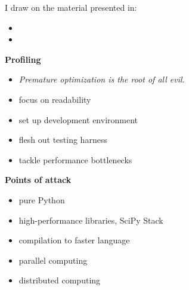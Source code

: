 \begin{frame} I draw on the material presented in:\vspace{0.3cm}

\begin{itemize}\setlength\itemsep{1em}
  \item {}
  \item {}
\end{itemize}

\end{frame}%
\begin{frame}\textbf{Profiling}\vspace{0.3cm}

\begin{itemize}\setlength\itemsep{1em}
    \item \textit{Premature optimization is the root of all evil.}
    \item focus on readability
    \item set up development environment
    \item flesh out testing harness
    \item tackle performance bottlenecks
\end{itemize}

\end{frame}
\begin{frame}\textbf{Points of attack}\vspace{0.3cm}

\begin{itemize}\setlength\itemsep{1em}
    \item pure Python
    \item high-performance libraries, SciPy Stack
    \item compilation to faster language
    \item parallel computing
    \item distributed computing
\end{itemize}

\end{frame}
\begin{frame}
	\begin{figure}[htp]\centering
	\end{figure}
\end{frame}
